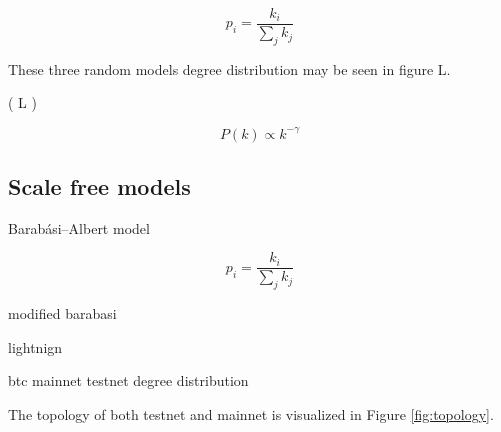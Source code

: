 \[ p_i = \dfrac{k_i}{\sum_{j}^{}k_j}  \]

These three random models degree distribution may be seen in figure L.

( L )


\[ P(k) \propto k^{-\gamma} \]

\subsection{Scale free models}
Barabási–Albert model

\[ p_i = \dfrac{k_i}{\sum_{j}^{}k_j}  \]

modified barabasi

lightnign 

btc mainnet testnet degree distribution

The topology of both testnet and mainnet is visualized in Figure \ref{fig:topology}.

\newpage
\onecolumn

